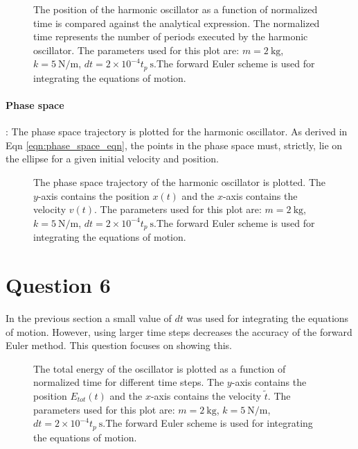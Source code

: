 \documentclass[10pt]{article}
\begin{document}
\begin{figure}[!htb]
\centering

\caption{The position of the harmonic oscillator as a function of normalized time is compared against the analytical expression. The normalized time represents the number of periods executed by the harmonic oscillator. The parameters used for this plot are: $m=2\ \mathrm{kg}$, $k=5\ \mathrm{N/m}$, $dt=2\times 10^{-4}t_{p}\ \mathrm{s}$.The forward Euler scheme is used for integrating the equations of motion.}
\end{figure}

\paragraph{Phase space}: The phase space trajectory is plotted for the harmonic oscillator. As derived in Eqn \eqref{eqn:phase_space_eqn}, the points in the phase space must, strictly, lie on the ellipse for a given initial velocity and position. 

\begin{figure}[!htb]
\centering

\caption{The phase space trajectory of the harmonic oscillator is plotted. The $y$-axis contains the position $x(t)$ and the $x$-axis contains the velocity $v(t)$. The parameters used for this plot are: $m=2\ \mathrm{kg}$, $k=5\ \mathrm{N/m}$, $dt=2\times 10^{-4}t_{p}\ \mathrm{s}$.The forward Euler scheme is used for integrating the equations of motion.}
\end{figure}

\section*{Question 6}
In the previous section a small value of $dt$ was used for integrating the equations of motion. However, using larger time steps decreases the accuracy of the forward Euler method. This question focuses on showing this. 

\begin{figure}[!htb]
\centering

\caption{The total energy of the oscillator is plotted as a function of normalized time for different time steps. The $y$-axis contains the position $E_{tot}(t)$ and the $x$-axis contains the velocity $\tilde{t}$. The parameters used for this plot are: $m=2\ \mathrm{kg}$, $k=5\ \mathrm{N/m}$, $dt=2\times 10^{-4}t_{p}\ \mathrm{s}$.The forward Euler scheme is used for integrating the equations of motion.}
\label{fig:euler_dt_compare}
\end{figure}
\end{document}
